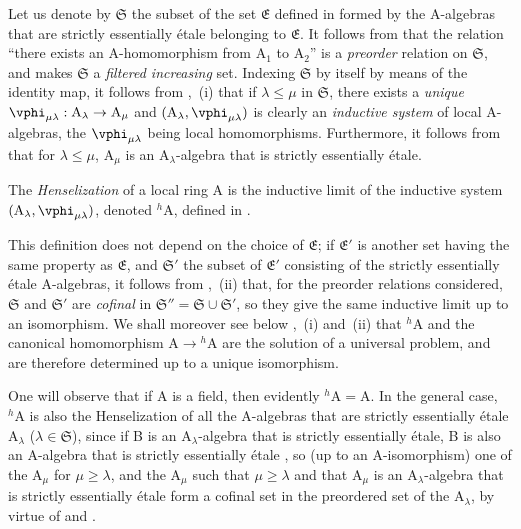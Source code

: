 \begin{env}[18.6.4]
\label{IV.18.6.4}
Let us denote by $\mathfrak{S}$ the subset of the set $\mathfrak{E}$ defined in  formed by the A-algebras that are strictly essentially \'{e}tale belonging to $\mathfrak{E}$.
It follows from  that the relation ``there exists an A-homomorphism from $\mathrm{A}_1$ to $\mathrm{A}_2$'' is a \emph{preorder} relation on $\mathfrak{S}$, and makes $\mathfrak{S}$ a \emph{filtered increasing} set.
Indexing $\mathfrak{S}$ by itself by means of the identity map, it follows from ,~(i) that if $\lambda\leq\mu$ in $\mathfrak{S}$, there exists a \emph{unique} $\vphi_{\mu\lambda}:\mathrm{A}_\lambda\to\mathrm{A}_\mu$ and $(\mathrm{A}_\lambda,\vphi_{\mu\lambda})$ is clearly an \emph{inductive system} of local A-algebras, the $\vphi_{\mu\lambda}$ being local homomorphisms.
Furthermore, it follows from  that for $\lambda\leq\mu$, $\mathrm{A}_\mu$ is an $\mathrm{A}_\lambda$-algebra that is strictly essentially \'{e}tale.
\end{env}

\begin{definition}[18.6.5]
\label{IV.18.6.5}
The \emph{Henselization} of a local ring $\mathrm{A}$ is the inductive limit of the inductive system $(\mathrm{A}_\lambda,\vphi_{\mu\lambda})$, denoted ${}^h\!\mathrm{A}$, defined in .
\end{definition}

This definition does not depend on the choice of $\mathfrak{E}$; if $\mathfrak{E}'$ is another set having the same property as $\mathfrak{E}$, and $\mathfrak{S}'$ the subset of $\mathfrak{E}'$ consisting of the strictly essentially \'{e}tale A-algebras, it follows from ,~(ii) that, for the preorder relations considered, $\mathfrak{S}$ and $\mathfrak{S}'$ are \emph{cofinal} in $\mathfrak{S}''=\mathfrak{S}\cup\mathfrak{S}'$, so they give the same inductive limit up to an isomorphism.
We shall moreover see below ,~(i) and~(ii) that ${}^h\!\mathrm{A}$ and the canonical homomorphism $\mathrm{A}\to{}^h\!\mathrm{A}$ are the solution of a universal problem, and are therefore determined up to a unique isomorphism.

One will observe that if A is a field, then evidently ${}^h\!\mathrm{A}=\mathrm{A}$.
In the general case, ${}^h\!\mathrm{A}$ is also the Henselization of all the A-algebras that are strictly essentially \'{e}tale $\mathrm{A}_\lambda$ ($\lambda\in\mathfrak{S}$), since if B is an $\mathrm{A}_\lambda$-algebra that is strictly essentially \'{e}tale, B is also an A-algebra that is strictly essentially \'{e}tale , so (up to an A-isomorphism) one of the $\mathrm{A}_\mu$ for $\mu\geq\lambda$, and the $\mathrm{A}_\mu$ such that $\mu\geq\lambda$ and that $\mathrm{A}_\mu$ is an $\mathrm{A}_\lambda$-algebra that is strictly essentially \'{e}tale form a cofinal set in the preordered set of the $\mathrm{A}_\lambda$, by virtue of  and .

